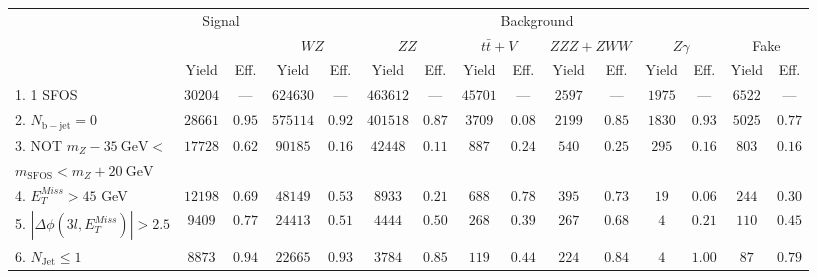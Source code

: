 \begin{tabular}{l||c|c||c|c||c|c||c|c||c|c||c|c||c|c}
\hline
 &\multicolumn{2}{c||}{Signal}            &  \multicolumn{12}{c}{Background}  \\
 & &  & \multicolumn{2}{c||}{$WZ$} & \multicolumn{2}{c||}{$ZZ$} & \multicolumn{2}{c||}{$t\bar{t}+V$} & \multicolumn{2}{c||}{$ZZZ+ZWW$} & \multicolumn{2}{c||}{$Z\gamma$} & \multicolumn{2}{c}{Fake} \\ 
 & Yield & Eff. & Yield & Eff. & Yield & Eff. & Yield & Eff. & Yield & Eff. & Yield & Eff. & Yield & Eff. \\
\hline\hline
1. 1 SFOS &  $30204$ &  --- &  $624630$ &  --- &  $463612$ &  --- &  $45701$ &  --- &  $2597$ &  --- &  $1975$ &  --- &  $6522$ &  ---\\ 
\hline
2. $N_{\mathrm{b-jet}} = 0$ &  $28661$ &  $0.95$ &  $575114$ &  $0.92$ &  $401518$ &  $0.87$ &  $3709$ &  $0.08$ &  $2199$ &  $0.85$ &  $1830$ &  $0.93$ &  $5025$ &  $0.77$\\ 
\hline
3. NOT $m_Z - 35~\mathrm{GeV} <$  &  \multirow{2}{*}{$17728$} &  \multirow{2}{*}{$0.62$} &  \multirow{2}{*}{$90185$} &  \multirow{2}{*}{$0.16$} &  \multirow{2}{*}{$42448$} &  \multirow{2}{*}{$0.11$} &  \multirow{2}{*}{$887$} &  \multirow{2}{*}{$0.24$} &  \multirow{2}{*}{$540$} &  \multirow{2}{*}{$0.25$} &  \multirow{2}{*}{$295$} &  \multirow{2}{*}{$0.16$} &  \multirow{2}{*}{$803$} &  \multirow{2}{*}{$0.16$} \\ 
$ m_{\mathrm{SFOS}} < m_Z + 20~\mathrm{GeV}$  & & & & & & & & & & & & & & \\
\hline
4. $E_{T}^{Miss} > 45$ GeV &  $12198$ &  $0.69$ &  $48149$ &  $0.53$ &  $8933$ &  $0.21$ &  $688$ &  $0.78$ &  $395$ &  $0.73$ &  $19$ &  $0.06$ &  $244$ &  $0.30$\\ 
\hline
5. $|\Delta\phi(3l,E_{T}^{Miss})| > 2.5$ &  $9409$ &  $0.77$ &  $24413$ &  $0.51$ &  $4444$ &  $0.50$ &  $268$ &  $0.39$ &  $267$ &  $0.68$ &  $4$ &  $0.21$ &  $110$ &  $0.45$\\ 
\hline
6. $N_{\mathrm{Jet}} \leq 1$ &  $8873$ &  $0.94$ &  $22665$ &  $0.93$ &  $3784$ &  $0.85$ &  $119$ &  $0.44$ &  $224$ &  $0.84$ &  $4$ &  $1.00$ &  $87$ &  $0.79$\\ 
\hline
\end{tabular}
